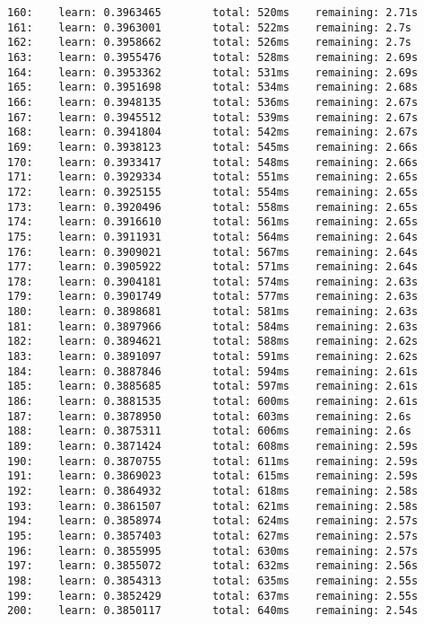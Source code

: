 \documentclass[11pt]{article}
\begin{document}
\begin{Verbatim}[commandchars=\\\{\}]
160:    learn: 0.3963465        total: 520ms    remaining: 2.71s
161:    learn: 0.3963001        total: 522ms    remaining: 2.7s
162:    learn: 0.3958662        total: 526ms    remaining: 2.7s
163:    learn: 0.3955476        total: 528ms    remaining: 2.69s
164:    learn: 0.3953362        total: 531ms    remaining: 2.69s
165:    learn: 0.3951698        total: 534ms    remaining: 2.68s
166:    learn: 0.3948135        total: 536ms    remaining: 2.67s
167:    learn: 0.3945512        total: 539ms    remaining: 2.67s
168:    learn: 0.3941804        total: 542ms    remaining: 2.67s
169:    learn: 0.3938123        total: 545ms    remaining: 2.66s
170:    learn: 0.3933417        total: 548ms    remaining: 2.66s
171:    learn: 0.3929334        total: 551ms    remaining: 2.65s
172:    learn: 0.3925155        total: 554ms    remaining: 2.65s
173:    learn: 0.3920496        total: 558ms    remaining: 2.65s
174:    learn: 0.3916610        total: 561ms    remaining: 2.65s
175:    learn: 0.3911931        total: 564ms    remaining: 2.64s
176:    learn: 0.3909021        total: 567ms    remaining: 2.64s
177:    learn: 0.3905922        total: 571ms    remaining: 2.64s
178:    learn: 0.3904181        total: 574ms    remaining: 2.63s
179:    learn: 0.3901749        total: 577ms    remaining: 2.63s
180:    learn: 0.3898681        total: 581ms    remaining: 2.63s
181:    learn: 0.3897966        total: 584ms    remaining: 2.63s
182:    learn: 0.3894621        total: 588ms    remaining: 2.62s
183:    learn: 0.3891097        total: 591ms    remaining: 2.62s
184:    learn: 0.3887846        total: 594ms    remaining: 2.61s
185:    learn: 0.3885685        total: 597ms    remaining: 2.61s
186:    learn: 0.3881535        total: 600ms    remaining: 2.61s
187:    learn: 0.3878950        total: 603ms    remaining: 2.6s
188:    learn: 0.3875311        total: 606ms    remaining: 2.6s
189:    learn: 0.3871424        total: 608ms    remaining: 2.59s
190:    learn: 0.3870755        total: 611ms    remaining: 2.59s
191:    learn: 0.3869023        total: 615ms    remaining: 2.59s
192:    learn: 0.3864932        total: 618ms    remaining: 2.58s
193:    learn: 0.3861507        total: 621ms    remaining: 2.58s
194:    learn: 0.3858974        total: 624ms    remaining: 2.57s
195:    learn: 0.3857403        total: 627ms    remaining: 2.57s
196:    learn: 0.3855995        total: 630ms    remaining: 2.57s
197:    learn: 0.3855072        total: 632ms    remaining: 2.56s
198:    learn: 0.3854313        total: 635ms    remaining: 2.55s
199:    learn: 0.3852429        total: 637ms    remaining: 2.55s
200:    learn: 0.3850117        total: 640ms    remaining: 2.54s

\end{Verbatim}
\end{document}
